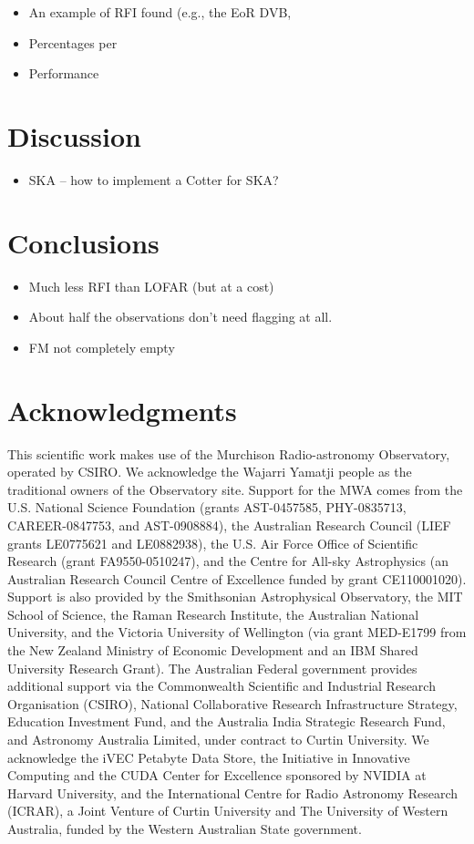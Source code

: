 \documentclass[useAMS,usenatbib]{mn2e}
\DeclareRobustCommand{\TUSSEN}[3]{#2}
\begin{document}
\begin{itemize}
 \item An example of RFI found (e.g., the EoR DVB, 
 \item Percentages per 
 \item Performance
\end{itemize}

\section{Discussion}
\begin{itemize}
 \item SKA -- how to implement a Cotter for SKA?
\end{itemize}

\section{Conclusions}
\begin{itemize}
 \item Much less RFI than LOFAR (but at a cost)
 \item About half the observations don't need flagging at all. 
 \item FM not completely empty
\end{itemize}

\section*{Acknowledgments}
This scientific work makes use of the Murchison Radio-astronomy Observatory, operated by CSIRO. We acknowledge the Wajarri Yamatji people as the traditional owners of the Observatory site. Support for the MWA comes from the U.S. National Science Foundation (grants AST-0457585, PHY-0835713, CAREER-0847753, and AST-0908884), the Australian Research Council (LIEF grants LE0775621 and LE0882938), the U.S. Air Force Office of Scientific Research (grant FA9550-0510247), and the Centre for All-sky Astrophysics (an Australian Research Council Centre of Excellence funded by grant CE110001020). Support is also provided by the Smithsonian Astrophysical Observatory, the MIT School of Science, the Raman Research Institute, the Australian National University, and the Victoria University of Wellington (via grant MED-E1799 from the New Zealand Ministry of Economic Development and an IBM Shared University Research Grant). The Australian Federal government provides additional support via the Commonwealth Scientific and Industrial Research Organisation (CSIRO), National Collaborative Research Infrastructure Strategy, Education Investment Fund, and the Australia India Strategic Research Fund, and Astronomy Australia Limited, under contract to Curtin University. We acknowledge the iVEC Petabyte Data Store, the Initiative in Innovative Computing and the CUDA Center for Excellence sponsored by NVIDIA at Harvard University, and the International Centre for Radio Astronomy Research (ICRAR), a Joint Venture of Curtin University and The University of Western Australia, funded by the Western Australian State government. 

\DeclareRobustCommand{\TUSSEN}[3]{#3}




\label{lastpage}
\end{document}
